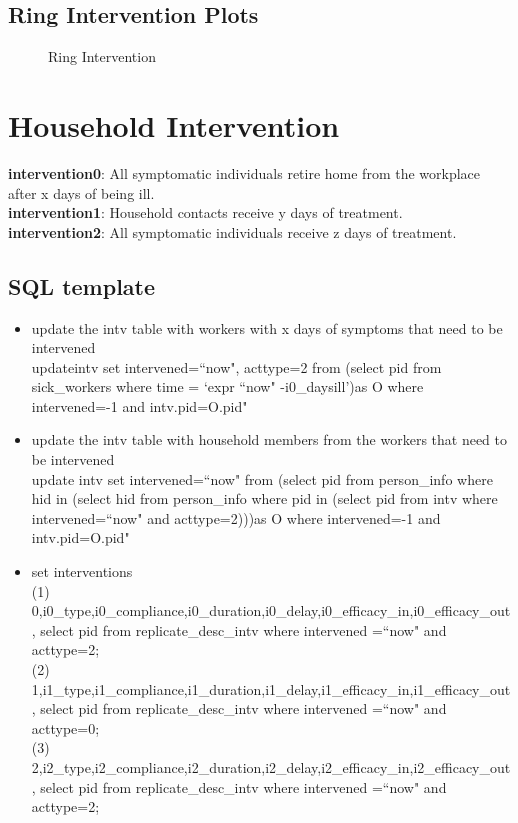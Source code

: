 \documentclass[11pt]{article}
\begin{document}
\subsection{Ring Intervention Plots}
\begin{figure}[h]
\caption{Ring Intervention}
\label{fig:ring}
\end{figure}

\section{Household Intervention} 
\textbf{intervention0}: All symptomatic individuals retire home from the workplace after x days of being ill.\\
\textbf{intervention1}: Household contacts receive y days of treatment.\\
\textbf{intervention2}: All symptomatic individuals receive z days of treatment.

\subsection{SQL template}
\begin{itemize}
\item update the intv table with workers with x days of symptoms that need to be intervened\\
updateintv set intervened=``now", acttype=2 from (select pid from sick\_workers where time = `expr ``now" -i0\_daysill')as O where intervened=-1 and intv.pid=O.pid"

\item update the intv table with household members from the workers that need to be intervened\\
update intv set intervened=``now" from (select pid from person\_info where hid in (select hid from person\_info where pid in (select pid from intv where intervened=``now" and acttype=2)))as O where intervened=-1 and intv.pid=O.pid"

\item set interventions\\
(1) 0,i0\_type,i0\_compliance,i0\_duration,i0\_delay,i0\_efficacy\_in,i0\_efficacy\_out, select pid from replicate\_desc\_intv where intervened =``now" and acttype=2;\\
(2) 1,i1\_type,i1\_compliance,i1\_duration,i1\_delay,i1\_efficacy\_in,i1\_efficacy\_out, select pid from replicate\_desc\_intv where intervened =``now" and acttype=0;\\
(3) 2,i2\_type,i2\_compliance,i2\_duration,i2\_delay,i2\_efficacy\_in,i2\_efficacy\_out, select pid from replicate\_desc\_intv where intervened =``now" and acttype=2;\\


        
\end{itemize}
\end{document}

